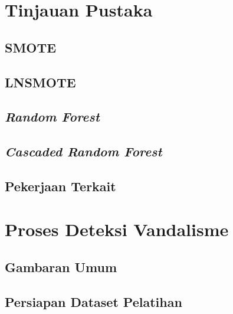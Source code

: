 \documentclass[12pt,a4paper,titlepage]{report}
\begin{document}
\chapter{Tinjauan Pustaka}
\label{bab:02}


	\section{SMOTE}
	\label{bab:02:smote}
	

	\section{LNSMOTE}
	\label{bab:02:lnsmote}
	

	\section{\textit{Random Forest}}
	\label{bab:02:rf}
	

	\section{\textit{Cascaded Random Forest}}
	\label{bab:02:crf}
	

	\section{Pekerjaan Terkait}\label{bab:02:pekerjaan_terkait}
	

\chapter{Proses Deteksi Vandalisme}
\label{bab:03}



	\section{Gambaran Umum}
	\label{bab:03:gambaran_umum}
	

	\section{Persiapan Dataset Pelatihan}
	\label{bab:03:persiapan_data_pelatihan}
	
\end{document}
